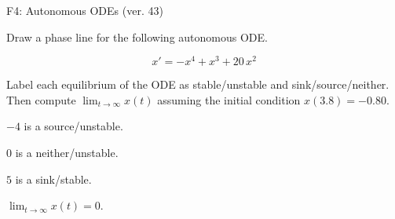 \begin{exercise}
  \begin{exerciseTitle}F4: Autonomous ODEs (ver. 43)\end{exerciseTitle}
  \begin{exerciseStatement}
    

      Draw a phase line for the following 
      autonomous ODE.
    

    
\[x'= -x^{4} + x^{3} + 20 \, x^{2}\]

    

      Label each equilibrium of the ODE
      as stable/unstable and sink/source/neither.
      Then compute \(\lim_{t\to\infty}x(t)\)
      assuming the initial condition
      \(x( 3.8 )= -0.80\).
    

  \end{exerciseStatement}
  \begin{exerciseAnswer}
    

      \(-4\) is a source/unstable.
      
        \(0\) is a neither/unstable.
      
      \(5\) is a sink/stable.
    

    

      \(\lim_{t\to\infty}x(t)=0\).
    

  \end{exerciseAnswer}
\end{exercise}